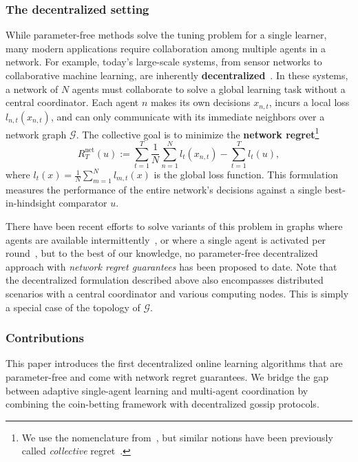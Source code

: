 \documentclass[journal]{IEEEtran} %
\begin{document}
\subsubsection*{The decentralized setting}
While parameter-free methods solve the tuning problem for a single learner, many modern applications require collaboration among multiple agents in a network.
For example, today's large-scale systems, from sensor networks to collaborative machine learning, are inherently \textbf{decentralized}~\cite{nedic_rate_2007,johansson_simple_2007}.
In these systems, a network of $N$ agents must collaborate to solve a global learning task without a central coordinator.
Each agent $n$ makes its own decisions $x_{n,t}$, incurs a local loss $l_{n,t}(x_{n,t})$, and can only communicate with its immediate neighbors over a network graph $\mathcal{G}$.
The collective goal is to minimize the \textbf{network regret}\footnote{We use the nomenclature from~\cite{achddou_distributed_2024}, but similar notions have been previously called \emph{collective} regret~\cite{hsieh_multi-agent_2022}.}
\begin{equation}
    R_{T}^{\text{net}}(u) := \sum_{t=1}^{T} \frac{1}{N} \sum_{n=1}^{N} l_{t}(x_{n,t}) - \sum_{t=1}^{T} l_{t}(u), \label{eq:network_regret}
\end{equation}
where $l_t(x) = \frac{1}{N}\sum_{m=1}^{N} l_{m,t}(x)$ is the global loss function.
This formulation measures the performance of the entire network's decisions against a single best-in-hindsight comparator $u$.

There have been recent efforts to solve variants of this problem in graphs where agents are available intermittently~\cite{achddou_distributed_2024}, or where a single agent is activated per round~\cite{hoeven_distributed_2021}, but to the best of our knowledge, no parameter-free decentralized approach with \emph{network regret guarantees} has been proposed to date.
Note that the decentralized formulation described above also encompasses distributed scenarios with a central coordinator and various computing nodes.
This is simply a special case of the topology of $\mathcal{G}$.

\subsubsection*{Contributions}
This paper introduces the first decentralized online learning algorithms that are parameter-free and come with network regret guarantees.
We bridge the gap between adaptive single-agent learning and multi-agent coordination by combining the coin-betting framework with decentralized gossip protocols.
\end{document}
